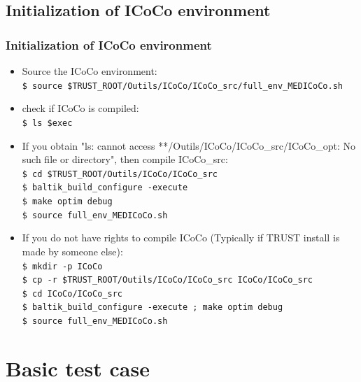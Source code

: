\documentclass[10pt, hyperref={unicode=true,pdfusetitle, bookmarks=true,bookmarksnumbered=false,bookmarksopen=false, breaklinks=false,pdfborder={0 0 1},backref=true,colorlinks=true,linkcolor=darkblue,pageanchor, urlcolor=darkblue}]{beamer}
\begin{document}
\begin{frame}
\subsection{Initialization of ICoCo environment}
\frametitle{Initialization of ICoCo environment}
\begin{block}{}

\begin{itemize}

\item Source the ICoCo environment:\\
\hspace{-0.5cm}\texttt{\$ source \$TRUST\_ROOT/Outils/ICoCo/ICoCo\_src/full\_env\_MEDICoCo.sh}

\item check if ICoCo is compiled:\\
\texttt{\$ ls \$exec} 

\item If you obtain "ls: cannot access **/Outils/ICoCo/ICoCo\_src/ICoCo\_opt: No such file or directory", then compile ICoCo\_src:\\
\texttt{\$ cd \$TRUST\_ROOT/Outils/ICoCo/ICoCo\_src}\\
\texttt{\$ baltik\_build\_configure -execute}\\
\texttt{\$ make optim debug }\\
\texttt{\$ source full\_env\_MEDICoCo.sh}

\item If you do not have rights to compile ICoCo (Typically if TRUST install is made by someone else): \\
\texttt{\$ mkdir -p ICoCo}\\
\texttt{\$ cp -r \$TRUST\_ROOT/Outils/ICoCo/ICoCo\_src ICoCo/ICoCo\_src}\\
\texttt{\$ cd ICoCo/ICoCo\_src}\\
\texttt{\$ baltik\_build\_configure -execute ; make optim debug }\\
\texttt{\$ source full\_env\_MEDICoCo.sh}

\end{itemize}

\end{block}
\end{frame}


\section{{\bf{Basic test case}}}
\begin{frame}
\end{frame}
\end{document}
